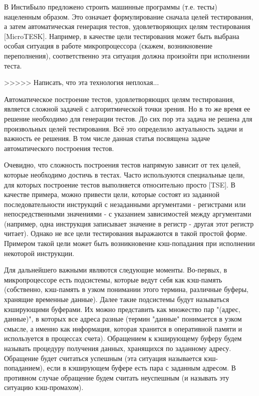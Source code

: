 В ИнстиБыло предложено строить машинные программы (т.е. тесты)
нацеленным образом. Это означает формулирование сначала целей
тестирования, а затем автоматическая генерация тестов,
удовлетворяющих целям тестирования [MicroTESK]. Например, в качестве
цели тестирования может быть выбрана особая ситуация в работе
микропроцессора (скажем, возникновение переполнения), соответственно
эта ситуация должна произойти при исполнении теста.

>>>>> Написать, что эта технология неплохая...

Автоматическое построение тестов, удовлетворяющих целям
тестирования, является сложной задачей с алгоритмической точки
зрения. Но в то же время ее решение необходимо для генерации тестов.
До сих пор эта задача не решена для произвольных целей тестирования.
Всё это определило актуальность задачи и важность ее решения. В том
числе данная статья посвящена задаче автоматического построения
тестов.

Очевидно, что сложность построения тестов напрямую зависит от тех
целей, которые необходимо достичь в тестах. Часто используются
специальные цели, для которых построение тестов выполняется
относительно просто [TSE]. В качестве примера, можно привести цели,
которые состоят из заданной последовательности инструкций с
незаданными аргументами - регистрами или непосредственными
значениями - с указанием зависимостей между аргументами (например,
одна инструкция записывает значение в регистр - другая этот регистр
читает). Однако не все цели тестирования выражаются в такой простой
форме. Примером такой цели может быть возникновение кэш-попадания
при исполнении некоторой инструкции.

Для дальнейшего важными являются следующие моменты. Во-первых, в
микропроцессоре есть подсистемы, которые ведут себя как кэш-память
(собственно, кэш-память в узком понимании этого термина, различные
буферы, хранящие временные данные). Далее такие подсистемы будут
называться кэширующими буферами. Их можно представить как множество
пар "(адрес, данные)", в которых все адреса разные (термин "данные"
понимается в узком смысле, а именно как информация, которая хранится
в оперативной памяти и используется в процессах счета). Обращением к
кэширующему буферу будем называть процедуру получения данных,
хранящихся по заданному адресу. Обращение будет считаться успешным
(эта ситуация называется кэш-попаданием), если в кэширующем буфере
есть пара с заданным адресом. В противном случае обращение будем
считать неуспешным (и называть эту ситуацию кэш-промахом).

